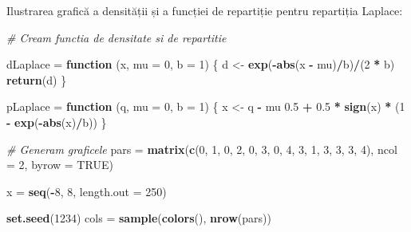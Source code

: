 \documentclass[
]{article}
\newenvironment{Shaded}{\begin{snugshade}}{\end{snugshade}}
\newcommand{\CommentTok}[1]{\textcolor[rgb]{0.56,0.35,0.01}{\textit{#1}}}
\newcommand{\ControlFlowTok}[1]{\textcolor[rgb]{0.13,0.29,0.53}{\textbf{#1}}}
\newcommand{\DataTypeTok}[1]{\textcolor[rgb]{0.13,0.29,0.53}{#1}}
\newcommand{\DecValTok}[1]{\textcolor[rgb]{0.00,0.00,0.81}{#1}}
\newcommand{\FloatTok}[1]{\textcolor[rgb]{0.00,0.00,0.81}{#1}}
\newcommand{\KeywordTok}[1]{\textcolor[rgb]{0.13,0.29,0.53}{\textbf{#1}}}
\newcommand{\NormalTok}[1]{#1}
\newcommand{\OperatorTok}[1]{\textcolor[rgb]{0.81,0.36,0.00}{\textbf{#1}}}
\newcommand{\OtherTok}[1]{\textcolor[rgb]{0.56,0.35,0.01}{#1}}
\newcommand{\StringTok}[1]{\textcolor[rgb]{0.31,0.60,0.02}{#1}}
\begin{document}
Ilustrarea grafică a densității și a funcției de repartiție pentru
repartiția Laplace:

\begin{Shaded}
\begin{Highlighting}[]
\CommentTok{# Cream functia de densitate si de repartitie }

\NormalTok{dLaplace =}\StringTok{ }\ControlFlowTok{function}\NormalTok{ (x, }\DataTypeTok{mu =} \DecValTok{0}\NormalTok{, }\DataTypeTok{b =} \DecValTok{1}\NormalTok{) }
\NormalTok{\{}
\NormalTok{    d <-}\StringTok{ }\KeywordTok{exp}\NormalTok{(}\OperatorTok{-}\KeywordTok{abs}\NormalTok{(x }\OperatorTok{-}\StringTok{ }\NormalTok{mu)}\OperatorTok{/}\NormalTok{b)}\OperatorTok{/}\NormalTok{(}\DecValTok{2} \OperatorTok{*}\StringTok{ }\NormalTok{b)}
    \KeywordTok{return}\NormalTok{(d)}
\NormalTok{\}}

\NormalTok{pLaplace =}\StringTok{ }\ControlFlowTok{function}\NormalTok{ (q, }\DataTypeTok{mu =} \DecValTok{0}\NormalTok{, }\DataTypeTok{b =} \DecValTok{1}\NormalTok{) }
\NormalTok{\{}
\NormalTok{    x <-}\StringTok{ }\NormalTok{q }\OperatorTok{-}\StringTok{ }\NormalTok{mu}
    \FloatTok{0.5} \OperatorTok{+}\StringTok{ }\FloatTok{0.5} \OperatorTok{*}\StringTok{ }\KeywordTok{sign}\NormalTok{(x) }\OperatorTok{*}\StringTok{ }\NormalTok{(}\DecValTok{1} \OperatorTok{-}\StringTok{ }\KeywordTok{exp}\NormalTok{(}\OperatorTok{-}\KeywordTok{abs}\NormalTok{(x)}\OperatorTok{/}\NormalTok{b))}
\NormalTok{\}}

\CommentTok{# Generam graficele }
\NormalTok{pars =}\StringTok{ }\KeywordTok{matrix}\NormalTok{(}\KeywordTok{c}\NormalTok{(}\DecValTok{0}\NormalTok{, }\DecValTok{1}\NormalTok{, }\DecValTok{0}\NormalTok{, }\DecValTok{2}\NormalTok{, }\DecValTok{0}\NormalTok{, }\DecValTok{3}\NormalTok{, }\DecValTok{0}\NormalTok{, }\DecValTok{4}\NormalTok{, }\DecValTok{3}\NormalTok{, }\DecValTok{1}\NormalTok{, }\DecValTok{3}\NormalTok{, }\DecValTok{3}\NormalTok{, }\DecValTok{3}\NormalTok{, }\DecValTok{4}\NormalTok{), }
              \DataTypeTok{ncol =} \DecValTok{2}\NormalTok{, }\DataTypeTok{byrow =} \OtherTok{TRUE}\NormalTok{)}

\NormalTok{x =}\StringTok{ }\KeywordTok{seq}\NormalTok{(}\OperatorTok{-}\DecValTok{8}\NormalTok{, }\DecValTok{8}\NormalTok{, }\DataTypeTok{length.out =} \DecValTok{250}\NormalTok{)}

\KeywordTok{set.seed}\NormalTok{(}\DecValTok{1234}\NormalTok{)}
\NormalTok{cols =}\StringTok{ }\KeywordTok{sample}\NormalTok{(}\KeywordTok{colors}\NormalTok{(), }\KeywordTok{nrow}\NormalTok{(pars))}


\end{Highlighting}
\end{Shaded}
\end{document}

